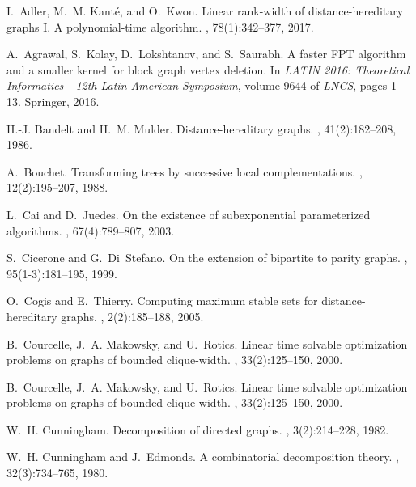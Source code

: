 \documentclass[11pt]{elsarticle}
\begin{document}
\begin{thebibliography}{10}

I.~Adler, M.~M. Kant\'e, and O.~Kwon.
\newblock Linear rank-width of distance-hereditary graphs {I}. {A}
  polynomial-time algorithm.
, 78(1):342--377, 2017.

A.~Agrawal, S.~Kolay, D.~Lokshtanov, and S.~Saurabh.
\newblock A faster {FPT} algorithm and a smaller kernel for block graph vertex
  deletion.
\newblock In {\em {LATIN} 2016: Theoretical Informatics - 12th Latin American
  Symposium}, volume 9644 of {\em LNCS}, pages 1--13. Springer, 2016.

H.-J. Bandelt and H.~M. Mulder.
\newblock Distance-hereditary graphs.
, 41(2):182--208, 1986.

A.~Bouchet.
\newblock Transforming trees by successive local complementations.
, 12(2):195--207, 1988.

L.~Cai and D.~Juedes.
\newblock On the existence of subexponential parameterized algorithms.
, 67(4):789--807, 2003.

S.~Cicerone and G.~Di~Stefano.
\newblock On the extension of bipartite to parity graphs.
, 95(1-3):181--195, 1999.

O.~Cogis and E.~Thierry.
\newblock Computing maximum stable sets for distance-hereditary graphs.
, 2(2):185--188, 2005.

B.~Courcelle, J.~A. Makowsky, and U.~Rotics.
\newblock Linear time solvable optimization problems on graphs of bounded
  clique-width.
, 33(2):125--150, 2000.

B.~Courcelle, J.~A. Makowsky, and U.~Rotics.
\newblock Linear time solvable optimization problems on graphs of bounded
  clique-width.
, 33(2):125--150, 2000.

W.~H. Cunningham.
\newblock Decomposition of directed graphs.
, 3(2):214--228, 1982.

W.~H. Cunningham and J.~Edmonds.
\newblock A combinatorial decomposition theory.
, 32(3):734--765, 1980.


\end{thebibliography}
\end{document}
